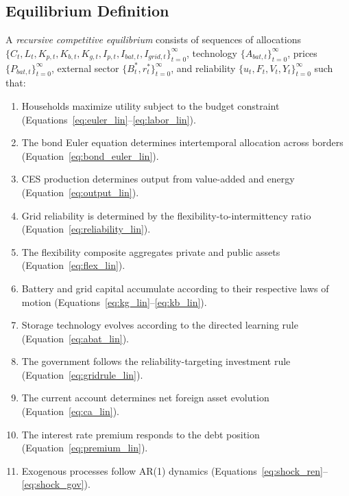 \documentclass[12pt, a4paper]{article}
\begin{document}
\subsection{Equilibrium Definition}

A \textit{recursive competitive equilibrium} consists of sequences of allocations $\{C_t, L_t, K_{p,t}, K_{b,t}, K_{g,t}, I_{p,t}, I_{bat,t}, I_{grid,t}\}_{t=0}^{\infty}$, technology $\{A_{bat,t}\}_{t=0}^{\infty}$, prices $\{P_{bat,t}\}_{t=0}^{\infty}$, external sector $\{B^*_t, r^*_t\}_{t=0}^{\infty}$, and reliability $\{u_t, F_t, V_t, Y_t\}_{t=0}^{\infty}$ such that:
\begin{enumerate}
    \item Households maximize utility subject to the budget constraint (Equations~\ref{eq:euler_lin}--\ref{eq:labor_lin}).
    \item The bond Euler equation determines intertemporal allocation across borders (Equation~\ref{eq:bond_euler_lin}).
    \item CES production determines output from value-added and energy (Equation~\ref{eq:output_lin}).
    \item Grid reliability is determined by the flexibility-to-intermittency ratio (Equation~\ref{eq:reliability_lin}).
    \item The flexibility composite aggregates private and public assets (Equation~\ref{eq:flex_lin}).
    \item Battery and grid capital accumulate according to their respective laws of motion (Equations~\ref{eq:kg_lin}--\ref{eq:kb_lin}).
    \item Storage technology evolves according to the directed learning rule (Equation~\ref{eq:abat_lin}).
    \item The government follows the reliability-targeting investment rule (Equation~\ref{eq:gridrule_lin}).
    \item The current account determines net foreign asset evolution (Equation~\ref{eq:ca_lin}).
    \item The interest rate premium responds to the debt position (Equation~\ref{eq:premium_lin}).
    \item Exogenous processes follow AR(1) dynamics (Equations~\ref{eq:shock_ren}--\ref{eq:shock_gov}).
\end{enumerate}
\end{document}
